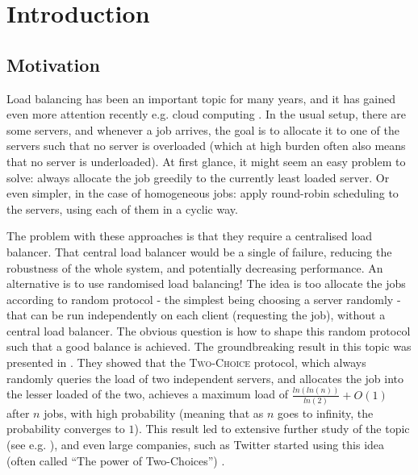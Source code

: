 \chapter{Introduction}

\ifpdf
    \graphicspath{{Chapter1/Figs/Raster/}{Chapter1/Figs/PDF/}{Chapter1/Figs/}}
\else
    \graphicspath{{Chapter1/Figs/Vector/}{Chapter1/Figs/}}
\fi


\section{Motivation}

Load balancing has been an important topic for many years, and it has gained even more attention recently e.g. cloud computing \cite{mishra2020cloud}. In the usual setup, there are some servers, and whenever a job arrives, the goal is to allocate it to one of the servers such that no server is overloaded (which at high burden often also means that no server is underloaded). At first glance, it might seem an easy problem to solve: always allocate the job greedily to the currently least loaded server. Or even simpler, in the case of homogeneous jobs: apply round-robin scheduling to the servers, using each of them in a cyclic way. 

The problem with these approaches is that they require a centralised load balancer. That central load balancer would be a single of failure, reducing the robustness of the whole system, and potentially decreasing performance. An alternative is to use randomised load balancing! The idea is too allocate the jobs according to random protocol - the simplest being choosing a server randomly - that can be run independently on each client (requesting the job), without a central load balancer. The obvious question is how to shape this random protocol such that a good balance is achieved. The groundbreaking result in this topic was presented in \cite{azar1999twochoice}. They showed that the \textsc{Two-Choice} protocol, which always randomly queries the load of two independent servers, and allocates the job into the lesser loaded of the two, achieves a maximum load of $\frac{ln(ln(n))}{ln(2)} + O(1)$ after $n$ jobs, with high probability (meaning that as $n$ goes to infinity, the probability converges to $1$). This result led to extensive further study of the topic (see e.g. \cite{richa2001surveytwochoice}), and even large companies, such as Twitter started using this idea (often called ``The power of Two-Choices'') \cite{anderson2019twitter}.


